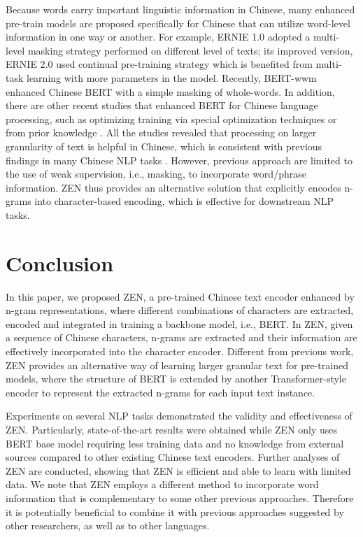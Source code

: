 \documentclass[11pt,a4paper]{article}
\begin{document}
\begin{CJK}{UTF8}{gbsn}
Because words carry important linguistic information in Chinese, many enhanced pre-train models are proposed specifically for Chinese that can utilize word-level information in one way or another. 
For example, ERNIE 1.0 \citep{sun2019ernie} adopted a multi-level masking strategy performed on different level of texts;
its improved version, ERNIE 2.0 \citep{sun2019ernie2} used continual pre-training strategy which is benefited from multi-task learning with more parameters in the model.
Recently, BERT-wwm \citep{cui2019pre} enhanced Chinese BERT with a simple masking of whole-words. 
In addition, there are other recent studies that enhanced BERT for Chinese language processing, such as optimizing training via special optimization techniques \cite{wei2019nezha} or from prior knowledge \cite{liu2019k}.
All the studies revealed that processing on larger granularity of text is helpful in Chinese, which is consistent with previous findings in many Chinese NLP tasks \citep{song-etal-2009-transliteration, song-xia-2012-using, wu2015named, chang1802hybrid, higashiyama-etal-2019-incorporating}.
However, previous approach are limited to the use of weak supervision, i.e., masking, to incorporate word/phrase information.
ZEN thus provides an alternative solution that explicitly encodes n-grams into character-based encoding, 
which is effective for downstream NLP tasks.











\section{Conclusion}
In this paper, we proposed ZEN, a pre-trained Chinese text encoder enhanced by n-gram representations,
where different combinations of characters are extracted, encoded and integrated in training a backbone model, i.e., BERT.
In ZEN, given a sequence of Chinese characters, n-grams are extracted and their information are effectively incorporated into the character encoder.
Different from previous work, ZEN provides an alternative way of learning larger granular text for pre-trained models, where the structure of BERT is extended by another Transformer-style encoder to represent the extracted n-grams for each input text instance.


Experiments on several NLP tasks demonstrated the validity and effectiveness of ZEN.
Particularly, state-of-the-art results were obtained while ZEN only uses BERT base model requiring less training data and no knowledge from external sources compared to other existing Chinese text encoders.
Further analyses of ZEN are conducted,
showing that ZEN is efficient and able to learn with limited data.
We note that ZEN employs a different method to incorporate word information that is complementary to some other previous approaches.
Therefore it is potentially beneficial to combine it with previous approaches suggested by other researchers, as well as to other languages.





\end{CJK}
\end{document}

